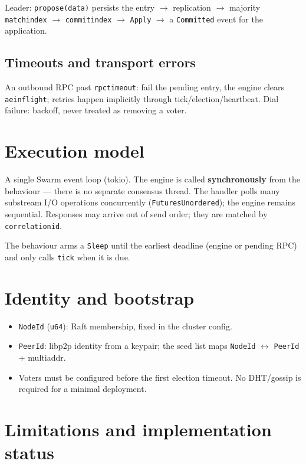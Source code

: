 \documentclass[11pt,a4paper]{article}
\newcommand{\code}[1]{{\def\_{\textunderscore\allowbreak}\texttt{#1}}}
\begin{document}
Leader: \code{propose(data)} persists the entry $\rightarrow$ replication $\rightarrow$ majority
\code{match\_index} $\rightarrow$ \code{commit\_index} $\rightarrow$ \code{Apply} $\rightarrow$
a \code{Committed} event for the application.

\subsection{Timeouts and transport errors}

An outbound RPC past \code{rpc\_timeout}: fail the pending entry, the engine clears
\code{ae\_inflight}; retries happen implicitly through tick/election/heartbeat. Dial failure:
backoff, never treated as removing a voter.

\section{Execution model}

A single Swarm event loop (tokio). The engine is called \textbf{synchronously} from the behaviour ---
there is no separate consensus thread. The handler polls many substream I/O operations concurrently
(\code{FuturesUnordered}); the engine remains sequential. Responses may arrive out of send order;
they are matched by \code{correlation\_id}.

The behaviour arms a \code{Sleep} until the earliest deadline (engine or pending RPC) and only
calls \code{tick} when it is due.

\section{Identity and bootstrap}

\begin{itemize}[nosep]
  \item \code{NodeId} (\code{u64}): Raft membership, fixed in the cluster config.
  \item \code{PeerId}: libp2p identity from a keypair; the seed list maps \code{NodeId} $\leftrightarrow$
        \code{PeerId} + multiaddr.
  \item Voters must be configured before the first election timeout. No DHT/gossip is required for a
        minimal deployment.
\end{itemize}

\section{Limitations and implementation status}
\end{document}
